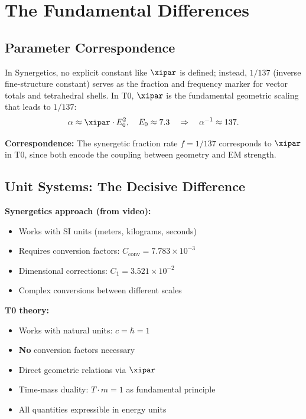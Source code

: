 	\section{The Fundamental Differences}
	
	\subsection{Parameter Correspondence}
	
	In Synergetics, no explicit constant like $\xipar$ is defined; instead, $1/137$ (inverse fine-structure constant) serves as the fraction and frequency marker for vector totals and tetrahedral shells. In T0, $\xipar$ is the fundamental geometric scaling that leads to $1/137$:
	\begin{equation}
		\alpha \approx \xipar \cdot E_0^2, \quad E_0 \approx 7.3 \quad \Rightarrow \quad \alpha^{-1} \approx 137.
	\end{equation}
	
	\textbf{Correspondence:} The synergetic fraction rate $f = 1/137$ corresponds to $\xipar$ in T0, since both encode the coupling between geometry and EM strength.
	
	\subsection{Unit Systems: The Decisive Difference}
	
	\begin{vergleich}
		\textbf{Synergetics approach (from video):}
		\begin{itemize}
			\item Works with SI units (meters, kilograms, seconds)
			\item Requires conversion factors: $C_{\text{conv}} = 7.783 \times 10^{-3}$
			\item Dimensional corrections: $C_1 = 3.521 \times 10^{-2}$
			\item Complex conversions between different scales
		\end{itemize}
		
		\textbf{T0 theory:}
		\begin{itemize}
			\item Works with natural units: $c = \hbar = 1$
			\item \textbf{No} conversion factors necessary
			\item Direct geometric relations via $\xipar$
			\item Time-mass duality: $T \cdot m = 1$ as fundamental principle
			\item All quantities expressible in energy units
		\end{itemize}
	\end{vergleich}
	
